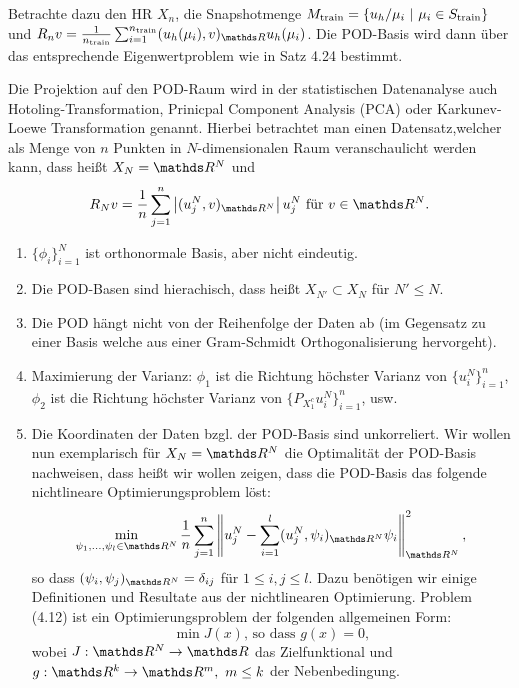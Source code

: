 Betrachte dazu den HR $X_n$, die Snapshotmenge $M_{\operatorname{train}} = \left\{ u_h/\mu_i~|~ \mu_i\in S_{\operatorname{train}}\right\}$ und $R_nv = \frac{1}{n_{\train}} \sum_{i=1}^{n_{\train}} (u_h(\mu_i),v)_{\R} u_h(\mu_i)$. 
Die POD-Basis wird dann über das entsprechende Eigenwertproblem wie in Satz 4.24 bestimmt.

Die Projektion auf den POD-Raum wird in der statistischen Datenanalyse auch Hotoling-Transformation, Prinicpal Component Analysis (PCA) oder Karkunev-Loewe Transformation genannt.
Hierbei betrachtet man einen Datensatz,welcher als Menge von $n$ Punkten in $N$-dimensionalen Raum veranschaulicht werden kann, dass heißt $X_N=\R^N$ und
\[
R_Nv = \frac{1}{n} \sum_{j=1}^n \abs{(u_j^N,v)_{\R^N}} u_j^N \text{ für } v\in \R^N.
\]

\begin{enumerate}[(1)]
	\item $\{\phi_i\}_{i=1}^N$ ist orthonormale Basis, aber nicht eindeutig.
	\item Die POD-Basen sind  hierachisch, dass heißt $X_{N'}\subset X_N$ für $N'\le N$.
	\item Die POD hängt nicht von der Reihenfolge der Daten ab (im Gegensatz zu einer Basis welche aus einer Gram-Schmidt Orthogonalisierung hervorgeht).
	\item Maximierung der Varianz: $\phi_1$ ist die Richtung höchster Varianz von $\{u_i^N\}_{i=1}^n$, $\phi_2$ ist die Richtung höchster Varianz von $\{ P_{X_1^c} u_i^N\}_{i=1}^n$, usw.
	\item Die Koordinaten der Daten bzgl. der POD-Basis sind unkorreliert.
	Wir wollen nun exemplarisch für $X_N=\R^N$ die Optimalität der POD-Basis nachweisen, dass heißt wir wollen zeigen, dass die POD-Basis das folgende nichtlineare Optimierungsproblem löst:
	\begin{align}
	\min\limits_{\psi_1\dt{,}\psi_l\in\R^N} \frac{1}{n} \sum_{j=1}^n \norm{u_j^N - \sum_{i=1}^l (u_j^N,\psi_i)_{\R^N}\psi_i}_{\R^N}^2,
	\end{align}
	so dass $(\psi_i,\psi_j)_{\R^N} = \delta_{ij}$ für $1\le i,j\le l$.
	Dazu benötigen wir einige Definitionen und Resultate aus der nichtlinearen Optimierung.
	Problem (4.12) ist ein Optimierungsproblem der folgenden allgemeinen Form:
	\[
	\min J(x) \text{, so dass } g(x) = 0, \tag*{(Op)}
	\]
	wobei $J:\R^N\to \R$ das Zielfunktional und $g:\R^k\to \R^m,~m\le k$ der Nebenbedingung.
\end{enumerate}

